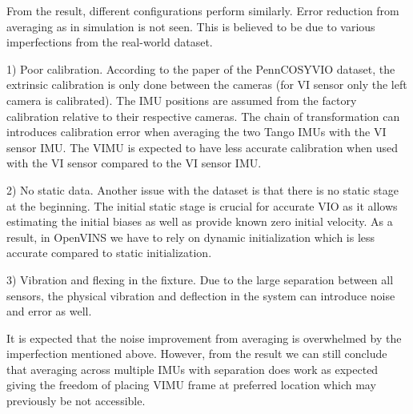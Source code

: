 \documentclass[conference]{IEEEtran}
\begin{document}
From the result, different configurations perform similarly. Error reduction from averaging as in simulation is not seen. This is believed to be due to various imperfections from the real-world dataset.

1) Poor calibration. According to the paper of the PennCOSYVIO dataset, the extrinsic calibration is only done between the cameras (for VI sensor only the left camera is calibrated). The IMU positions are assumed from the factory calibration relative to their respective cameras. The chain of transformation can introduces calibration error when averaging the two Tango IMUs with the VI sensor IMU. The VIMU is expected to have less accurate calibration when used with the VI sensor compared to the VI sensor IMU.

2) No static data. Another issue with the dataset is that there is no static stage at the beginning. The initial static stage is crucial for accurate VIO as it allows estimating the initial biases as well as provide known zero initial velocity. As a result, in OpenVINS we have to rely on dynamic initialization which is less accurate compared to static initialization.

3) Vibration and flexing in the fixture. Due to the large separation between all sensors, the physical vibration and deflection in the system can introduce noise and error as well.

It is expected that the noise improvement from averaging is overwhelmed by the imperfection mentioned above. However, from the result we can still conclude that averaging across multiple IMUs with separation does work as expected giving the freedom of placing VIMU frame at preferred location which may previously be not accessible.
\end{document}
